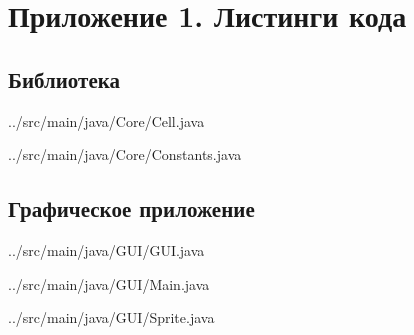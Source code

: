 \documentclass[a4paper]{article}
\begin{document}
\newpage
\section{Приложение 1. Листинги кода}
\subsection{Библиотека}


{../src/main/java/Core/Cell.java}
\newpage


{../src/main/java/Core/Constants.java}
\newpage



\subsection{Графическое приложение}


{../src/main/java/GUI/GUI.java}
\newpage


{../src/main/java/GUI/Main.java}
\newpage


{../src/main/java/GUI/Sprite.java}
\newpage
\end{document}
